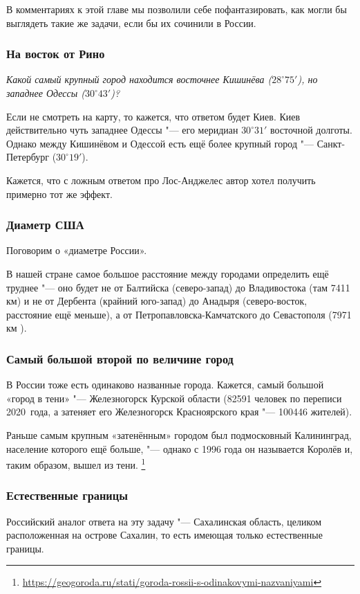 \documentclass[twoside]{book}
\begin{document}
В комментариях к этой главе мы позволили себе пофантазировать, как могли бы выглядеть такие же задачи, если бы их сочинили в России.

\subsubsection*{На восток от Рино}
\emph{Какой самый крупный город находится восточнее Кишинёва ($28^\circ75'$), но западнее Одессы ($30^\circ43'$)?}

Если не смотреть на карту, то кажется, что ответом будет Киев. Киев действительно чуть западнее Одессы "--- его
меридиан $30^\circ31'$ восточной долготы.
Однако между Кишинёвом и Одессой есть ещё более крупный город "--- Санкт-Петербург
($30^\circ19'$).

Кажется, что с ложным ответом про Лос-Анджелес автор хотел получить примерно тот же эффект.


\subsubsection{Диаметр США}
Поговорим о «диаметре России». 

В нашей стране самое большое расстояние между городами определить ещё труднее "--- оно будет не от Балтийска 
(северо-запад) до Владивостока (там 7411 км) и не от Дербента (крайний юго-запад) до Анадыря (северо-восток, 
расстояние ещё меньше), а от Петропавловска-Камчатского до Севастополя (7971 км%
).


\subsubsection{Самый большой второй по величине город}
В России тоже есть одинаково названные города. 
Кажется, самый большой «город в тени» "--- Железногорск Курской области (82591 человек по переписи 2020~года, 
а затеняет его Железногорск Красноярского края "--- 100446 жителей). 

Раньше самым крупным «затенённым» городом был подмосковный Калининград, население которого ещё больше, "---
однако с 1996 года он называется Королёв и, таким образом, вышел из тени.%
\footnote{\url{https://geogoroda.ru/stati/goroda-rossii-s-odinakovymi-nazvaniyami}}

\subsubsection{Естественные границы}
Российский аналог ответа на эту задачу "--- Сахалинская область, целиком расположенная на острове Сахалин,
то есть имеющая только естественные границы.
\end{document}
